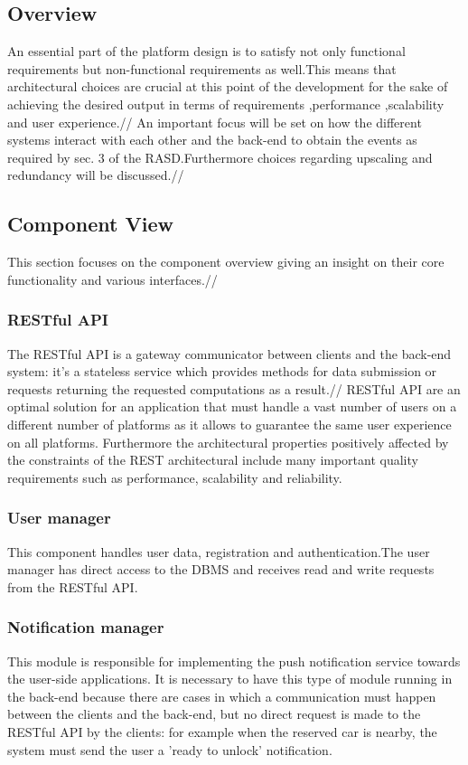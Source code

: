 \subsection{Overview}
An essential part of the platform design is to satisfy not only functional requirements but non-functional requirements as well.This means that architectural choices are crucial at this point of the development for the sake of achieving the desired output in terms of requirements ,performance ,scalability and user experience.//
An important focus will be set on how the different systems interact with each other and the back-end to obtain the events as required by sec. 3 of the RASD.Furthermore choices regarding upscaling and redundancy will be discussed.//

\subsection{Component View}
This section focuses on the component overview giving an insight on their core functionality and various interfaces.//
\subsubsection{RESTful API}
The RESTful API is a gateway communicator between clients and the back-end system: it's a stateless service which provides methods for data submission or requests returning the requested computations as a result.//
RESTful API are an optimal solution for an application that must handle a vast number of users on a different number of platforms as it allows to guarantee the same user experience on all platforms. Furthermore the architectural properties positively affected by the constraints of the REST architectural include many important quality requirements such as performance, scalability and reliability.

\subsubsection{User manager}
This component handles user data, registration and authentication.The user manager has direct access to the DBMS and receives read and write requests from the RESTful API.
\subsubsection{Notification manager}
This module is responsible for implementing the push notification service towards
the user-side applications.
It is necessary to have this type of module running in the back-end because
there are cases in which a communication must happen between the clients and
the back-end, but no direct request is made to the RESTful API by the clients:
for example when the reserved car is nearby, the system must send the user a 'ready to unlock' notification.
